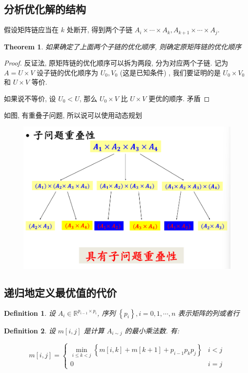 \documentclass[a4paper, 10pt]{ctexart} %
\newtheorem{theorem}{Theorem}
\newtheorem{definition}{Definition}
\begin{document}
\subsection{分析优化解的结构}
假设矩阵链应当在 $k$ 处断开, 得到两个子链 $A_i \times \cdots  \times A_{k}, A_{k+1} \times \cdots  \times A_{j}$.
\begin{theorem}
    如果确定了上面两个子链的优化顺序, 则确定原矩阵链的优化顺序
\end{theorem}
\begin{proof}
    反证法, 原矩阵链的优化顺序可以拆为两段, 分为对应两个子链. 记为 $A =U \times V$\footnotemark
    设子链的优化顺序为 $U_{0} , V_0$ (这是已知条件) , 我们要证明的是 $U_0 \times V_0$ 和 $U \times V$ 等价\footnotemark.

    如果说不等价, 设 $U_0< U$, 那么 $U_0 \times V$ 比 $U \times V$ 更优的顺序. 矛盾
\end{proof}
如图, 有重叠子问题, 所以说可以使用动态规划
\begin{figure}[H]
    \centering
    \includegraphics[scale = 0.5]{6.png}
\end{figure}

\subsection{递归地定义最优值的代价}
\begin{definition}
设 $A_i \in \mathbb{R} ^{p_{i-1}\times p_{i}}$, 序列 $\left\{ p_{i}\right\}, i = 0, 1 , \cdots  , n$ 表示矩阵的列或者行\\ 
\end{definition}
\begin{definition}
设 $m [i, j ]$ 是计算 $A_{i \sim j}$ 的最小乘法数. 有:
\end{definition}
\[
    m\left[ i,j  \right]= 
    \begin{cases}
        \min_{i\le k <j} \left\{ m[i , k] + m [k+1 ] + p_{i-1} p_k p_j\right\} & i < j\\
        0 & i = j 
    \end{cases}
\]
\end{document}
